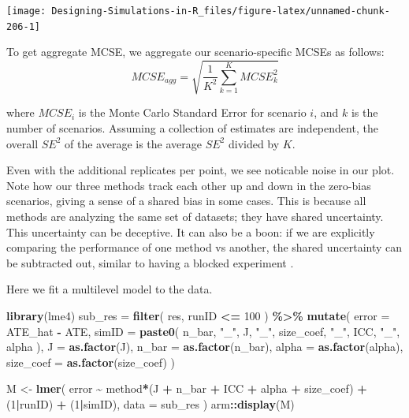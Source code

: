\documentclass[
]{book}
\newenvironment{Shaded}{\begin{snugshade}}{\end{snugshade}}
\newcommand{\AttributeTok}[1]{\textcolor[rgb]{0.13,0.29,0.53}{#1}}
\newcommand{\DecValTok}[1]{\textcolor[rgb]{0.00,0.00,0.81}{#1}}
\newcommand{\FunctionTok}[1]{\textcolor[rgb]{0.13,0.29,0.53}{\textbf{#1}}}
\newcommand{\NormalTok}[1]{#1}
\newcommand{\OtherTok}[1]{\textcolor[rgb]{0.56,0.35,0.01}{#1}}
\newcommand{\SpecialCharTok}[1]{\textcolor[rgb]{0.81,0.36,0.00}{\textbf{#1}}}
\newcommand{\StringTok}[1]{\textcolor[rgb]{0.31,0.60,0.02}{#1}}
\begin{document}
\begin{center}\texttt{[image: Designing-Simulations-in-R\_files/figure-latex/unnamed-chunk-206-1]} \end{center}

To get aggregate MCSE, we aggregate our scenario-specific MCSEs as follows:
\[ MCSE_{agg} = \sqrt{ \frac{1}{K^2} \sum_{k=1}^{K} MCSE_k^2 } \]

where \(MCSE_i\) is the Monte Carlo Standard Error for scenario \(i\), and \(k\) is the number of scenarios.
Assuming a collection of estimates are independent, the overall \(SE^2\) of the average is the average \(SE^2\) divided by \(K\).

Even with the additional replicates per point, we see noticable noise in our plot.
Note how our three methods track each other up and down in the zero-bias scenarios, giving a sense of a shared bias in some cases.
This is because all methods are analyzing the same set of datasets; they have shared uncertainty.
This uncertainty can be deceptive.
It can also be a boon: if we are explicitly comparing the performance of one method vs another, the shared uncertainty can be subtracted out, similar to having a blocked experiment \citet{gilbert2024multilevel}.

Here we fit a multilevel model to the data.

\begin{Shaded}
\begin{Highlighting}[]
\FunctionTok{library}\NormalTok{(lme4)}
\NormalTok{sub\_res }\OtherTok{=} \FunctionTok{filter}\NormalTok{( res, runID }\SpecialCharTok{\textless{}=} \DecValTok{100}\NormalTok{ ) }\SpecialCharTok{\%\textgreater{}\%}
  \FunctionTok{mutate}\NormalTok{( }\AttributeTok{error =}\NormalTok{ ATE\_hat }\SpecialCharTok{{-}}\NormalTok{ ATE,}
          \AttributeTok{simID =} \FunctionTok{paste0}\NormalTok{( n\_bar, }\StringTok{"\_"}\NormalTok{, J, }\StringTok{"\_"}\NormalTok{, size\_coef, }\StringTok{"\_"}\NormalTok{, ICC, }\StringTok{"\_"}\NormalTok{, alpha ),}
          \AttributeTok{J =} \FunctionTok{as.factor}\NormalTok{(J),}
          \AttributeTok{n\_bar =} \FunctionTok{as.factor}\NormalTok{(n\_bar),}
          \AttributeTok{alpha =} \FunctionTok{as.factor}\NormalTok{(alpha),}
          \AttributeTok{size\_coef =} \FunctionTok{as.factor}\NormalTok{(size\_coef) )}

\NormalTok{M }\OtherTok{\textless{}{-}} \FunctionTok{lmer}\NormalTok{( error }\SpecialCharTok{\textasciitilde{}}\NormalTok{ method}\SpecialCharTok{*}\NormalTok{(J }\SpecialCharTok{+}\NormalTok{ n\_bar }\SpecialCharTok{+}\NormalTok{ ICC }\SpecialCharTok{+}\NormalTok{ alpha }\SpecialCharTok{+}\NormalTok{ size\_coef) }\SpecialCharTok{+}\NormalTok{ (}\DecValTok{1}\SpecialCharTok{|}\NormalTok{runID) }\SpecialCharTok{+}\NormalTok{ (}\DecValTok{1}\SpecialCharTok{|}\NormalTok{simID),}
           \AttributeTok{data =}\NormalTok{ sub\_res )}
\NormalTok{arm}\SpecialCharTok{::}\FunctionTok{display}\NormalTok{(M)}
\end{Highlighting}
\end{Shaded}
\end{document}

